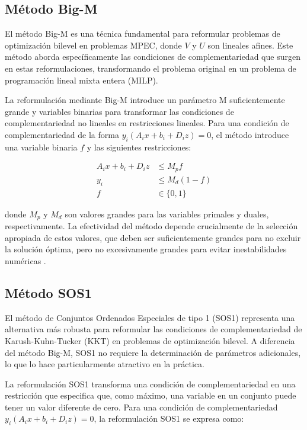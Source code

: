 \subsection{Método Big-M}

El método Big-M es una técnica fundamental para reformular problemas de optimización bilevel en problemas MPEC, donde $V$ y $U$ son lineales afines. Este método aborda específicamente las condiciones de complementariedad que surgen en estas reformulaciones, transformando el problema original en un problema de programación lineal mixta entera (MILP).

La reformulación mediante Big-M introduce un parámetro M suficientemente grande y variables binarias para transformar las condiciones de complementariedad no lineales en restricciones lineales. Para una condición de complementariedad de la forma $y_i(A_ix + b_i + D_iz) = 0$, el método introduce una variable binaria $f$ y las siguientes restricciones:

\begin{align*}
A_ix + b_i + D_iz &\leq M_p f \\
y_i &\leq M_d(1 - f) \\
f &\in \{0,1\}
\end{align*}

donde $M_p$ y $M_d$ son valores grandes para las variables primales y duales, respectivamente. La efectividad del método depende crucialmente de la selección apropiada de estos valores, que deben ser suficientemente grandes para no excluir la solución óptima, pero no excesivamente grandes para evitar inestabilidades numéricas \cite{BilevelJump}.

\subsection{Método SOS1}

El método de Conjuntos Ordenados Especiales de tipo 1 (SOS1) representa una alternativa más robusta para reformular las condiciones de complementariedad de Karush-Kuhn-Tucker (KKT) en problemas de optimización bilevel. A diferencia del método Big-M, SOS1 no requiere la determinación de parámetros adicionales, lo que lo hace particularmente atractivo en la práctica.

La reformulación SOS1 transforma una condición de complementariedad en una restricción que especifica que, como máximo, una variable en un conjunto puede tener un valor diferente de cero. Para una condición de complementariedad $y_i(A_ix + b_i + D_iz) = 0$, la reformulación SOS1 se expresa como:

